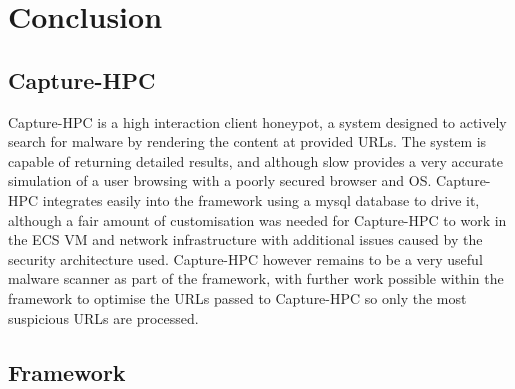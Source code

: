 \section{Conclusion} 
 


\subsection{Capture-HPC}

Capture-HPC is a high interaction client honeypot, a system designed to actively
search for malware by rendering the content at provided URLs. The system is
capable of returning detailed results, and although slow provides a very
accurate simulation of a user browsing with a poorly secured browser and OS.
Capture-HPC integrates easily into the framework using a mysql database to drive
it, although a fair amount of customisation was needed for Capture-HPC to work
in the ECS VM and network infrastructure with additional issues caused by the
security architecture used. Capture-HPC however remains to be a very useful
malware scanner as part of the framework, with further work possible within the
framework to optimise the URLs passed to Capture-HPC so only the most suspicious
URLs are processed. 

\subsection{Framework}
